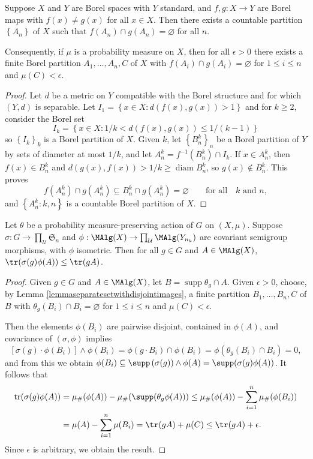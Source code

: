 \begin{lemma}\label{lemmaseparatesetwithdisjointimages}
Suppose $X$ and $Y$ are Borel spaces with $Y$ standard, and $f,g:X\to Y$ are Borel maps with $f(x)\neq g(x)$ for all $x\in X$. Then there exists a countable partition $\left\{A_n\right\}$ of $X$ such that $f(A_n)\cap g(A_n)=\varnothing$ for all $n$.

Consequently, if $\mu$ is a probability measure on $X$, then for all $\epsilon>0$ there exists a finite Borel partition $A_1,\ldots,A_n,C$ of $X$ with $f(A_i)\cap g(A_i)=\varnothing$ for $1\leq i\leq n$ and $\mu(C)<\epsilon$.
\end{lemma}
\begin{proof}
Let $d$ be a metric on $Y$ compatible with the Borel structure and for which $(Y,d)$ is separable. Let $I_1=\left\{x\in X:d(f(x),g(x))>1\right\}$ and for $k\geq 2$, consider the Borel set
\[I_k=\left\{x\in X:1/k<d(f(x),g(x))\leq 1/(k-1)\right\}\]
so $\left\{I_k\right\}_k$ is a Borel partition of $X$. Given $k$, let $\left\{B^k_n\right\}_n$ be a Borel partition of $Y$ by sets of diameter at most $1/k$, and let $A^k_n=f^{-1}(B^k_n)\cap I_k$. If $x\in A^k_n$, then $f(x)\in B^k_n$ and $d(g(x),f(x))>1/k\geq \operatorname{diam}B^k_n$, so $g(x)\not\in B^k_n$. This proves
\[f(A^k_n)\cap g(A^k_n)\subseteq B^k_n\cap g(A^k_n)=\varnothing\qquad\text{for all}\quad k\text{ and }n,\]
and $\left\{A^k_n:k,n\right\}$ is a countable Borel partition of $X$.\qedhere
\end{proof}

\begin{lemma}\label{lemmatraceissmallerundercovariant}
Let $\theta$ be a probability measure-preserving action of $G$ on $(X,\mu)$. Suppose $\sigma:G\to\prod_\mathcal{U}\mathfrak{S}_n$ and $\phi:\MAlg(X)\to\prod_\mathcal{U}\MAlg(Y_{n_k})$ are covariant semigroup morphisms, with $\phi$ isometric. Then for all $g\in G$ and $A\in\MAlg(X)$, $\tr(\sigma(g)\phi(A))\leq\tr(gA)$.
\end{lemma}
\begin{proof}
Given $g\in G$ and $A\in\MAlg(X)$, let $B=\operatorname{supp}\theta_g\cap A$. Given $\epsilon>0$, choose, by Lemma \ref{lemmaseparatesetwithdisjointimages}, a finite partition $B_1,\ldots,B_n,C$ of $B$ with $\theta_g(B_i)\cap B_i=\varnothing$ for $1\leq i\leq n$ and $\mu(C)<\epsilon$.

Then the elements $\phi(B_i)$ are pairwise disjoint, contained in $\phi(A)$, and covariance of $(\sigma,\phi)$ implies
\[\left[\sigma(g)\cdot\phi(B_i)\right]\land\phi(B_i)=\phi(g\cdot B_i)\cap\phi(B_i)=\phi(\theta_g(B_i)\cap B_i)=0,\]
and from this we obtain $\phi(B_i)\subseteq\supp\left(\sigma(g)\right)\land \phi(A)=\supp(\sigma(g)\phi(A))$. It follows that
\begin{align*}
\operatorname{tr}(\sigma(g)\phi(A))&=\mu_\#(\phi(A))-\mu_\#(\supp(\theta_g\phi(A)))\leq\mu_\#(\phi(A))-\sum_{i=1}^n\mu_\#(\phi(B_i))\\
&=\mu(A)-\sum_{i=1}^n\mu(B_i)=\tr(gA)+\mu(C)\leq\tr(gA)+\epsilon.
\end{align*}
Since $\epsilon$ is arbitrary, we obtain the result.\qedhere
\end{proof}

